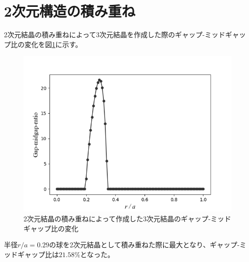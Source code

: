\documentclass[platex,dvipdfmx]{jsreport}
\numberwithin{equation}{section}
\begin{document}
\section{2次元構造の積み重ね}
2次元結晶の積み重ねによって3次元結晶を作成した際のギャップ-ミッドギャップ比の変化を図\ref{fig:stack-crystals}に示す。
\begin{figure}[htbp]
  \centering
  \includegraphics[width=0.6\linewidth]{results/stack-crystals.png}
  \caption{2次元結晶の積み重ねによって作成した3次元結晶のギャップ-ミッドギャップ比の変化}
  \label{fig:stack-crystals}
\end{figure}
半径$r / a = 0.29$の球を2次元結晶として積み重ねた際に最大となり、ギャップ-ミッドギャップ比は$21.58 \%$となった。
\end{document}
